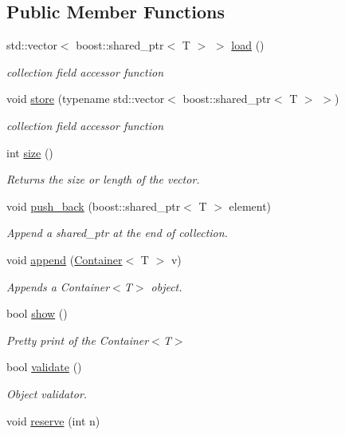 \subsection*{Public Member Functions}
\begin{DoxyCompactItemize}
\item 
std::vector$<$ boost::shared\_\-ptr$<$ T $>$ $>$ \hyperlink{classvec_a_m_o_r_e_aeabf8a479f9031cc8ef9af0a971a08ea}{load} ()
\begin{DoxyCompactList}\small\item\em collection field accessor function \end{DoxyCompactList}\item 
void \hyperlink{classvec_a_m_o_r_e_ad1594c084d534c3de7acedd714f2e12a}{store} (typename std::vector$<$ boost::shared\_\-ptr$<$ T $>$ $>$)
\begin{DoxyCompactList}\small\item\em collection field accessor function \end{DoxyCompactList}\item 
int \hyperlink{classvec_a_m_o_r_e_ae1289a7870dbdd19b6455a890e94ce48}{size} ()
\begin{DoxyCompactList}\small\item\em Returns the size or length of the vector. \end{DoxyCompactList}\item 
void \hyperlink{classvec_a_m_o_r_e_a7b02ec757039b4d8fa98c3682002f156}{push\_\-back} (boost::shared\_\-ptr$<$ T $>$ element)
\begin{DoxyCompactList}\small\item\em Append a shared\_\-ptr at the end of collection. \end{DoxyCompactList}\item 
void \hyperlink{classvec_a_m_o_r_e_ab060ffa67e85997fc4236bedfd2f17b6}{append} (\hyperlink{classvec_a_m_o_r_e}{Container}$<$ T $>$ v)
\begin{DoxyCompactList}\small\item\em Appends a Container$<$T$>$ object. \end{DoxyCompactList}\item 
bool \hyperlink{classvec_a_m_o_r_e_a11b0ffb0d2481f1960cb49a26b227d37}{show} ()
\begin{DoxyCompactList}\small\item\em Pretty print of the Container$<$T$>$ \end{DoxyCompactList}\item 
bool \hyperlink{classvec_a_m_o_r_e_a247aaafe9115cc433fc3be297c1f568e}{validate} ()
\begin{DoxyCompactList}\small\item\em Object validator. \end{DoxyCompactList}\item 
void \hyperlink{classvec_a_m_o_r_e_ad8b51e17ac5ba203cb3d0221b4f7de2f}{reserve} (int n)
\end{DoxyCompactItemize}
